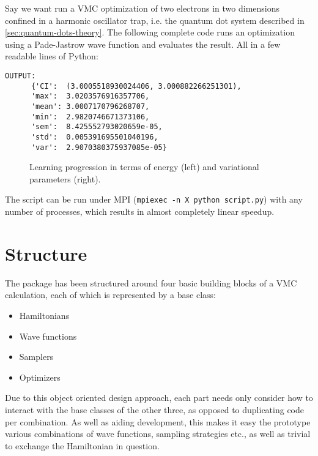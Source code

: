 \documentclass[Thesis.tex]{subfiles}
\begin{document}
Say we want run a VMC optimization of two electrons in two
dimensions confined in a harmonic oscillator trap, i.e. the quantum dot system
described in \cref{sec:quantum-dots-theory}. The following complete code runs an
optimization using a Pade-Jastrow wave function and evaluates the result. All in
a few readable lines of Python:\\



\begin{lstlisting}[basicstyle=\scriptsize]
  OUTPUT:
      {'CI':  (3.0005518930024406, 3.000882266251301),
      'max':  3.0203576916357706,
      'mean': 3.0007170796268707,
      'min':  2.9820746671373106,
      'sem':  8.425552793020659e-05,
      'std':  0.005391695501040196,
      'var':  2.9070380375937085e-05}
\end{lstlisting}

\begin{figure}[h]
  \centering
      
  \caption{Learning progression in terms of energy (left) and variational
    parameters (right).}
  \label{fig:quickstart-example}
\end{figure}

\noindent The script can be run under MPI (\texttt{mpiexec -n X python script.py}) with any number of processes, which results in almost completely linear speedup.

\section{Structure}

The package has been structured around four basic building blocks of a VMC
calculation, each of which is represented by a base class:

\begin{itemize}
\item Hamiltonians
\item Wave functions
\item Samplers
\item Optimizers
\end{itemize}

Due to this object oriented design approach, each part needs only consider how
to interact with the base classes of the other three, as opposed to duplicating
code per combination. As well as aiding development, this makes it easy the
prototype various combinations of wave functions, sampling strategies etc., as
well as trivial to exchange the Hamiltonian in question.
\end{document}
